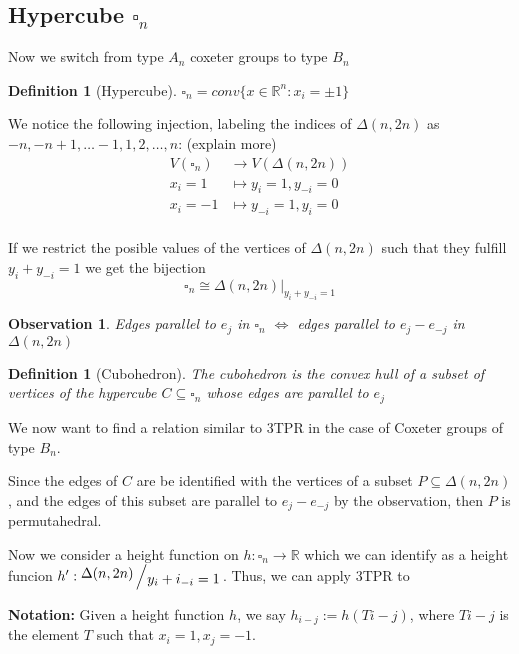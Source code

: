 \documentclass[leqno]{article}
\numberwithin{equation}{section}
\numberwithin{theorem}{section}
\newtheorem{definition}[theorem]{Definition}
\newtheorem{observation}[theorem]{Observation}
\newcommand{\bigslant}[2]{{\raisebox{.2em}{$#1$}\left/\raisebox{-.2em}{$#2$}\right.}}
\begin{document}
\subsection{Hypercube $\square_n$}

Now we switch from type $A_n$ coxeter groups to type $B_n$

\begin{definition}[Hypercube]
$\square_n  = conv\{x\in \mathbb{R}^n: x_i = \pm 1\}$
\end{definition}

We notice the following injection, labeling the indices of $\Delta(n, 2n)$ as  $-n, -n+1,  \ldots -1, 1, 2, \ldots ,n$: (explain more)
\begin{align*}
  V(\square_n) &\to V(\Delta(n, 2n)) \\
  x_i = 1 & \mapsto y_i=1, y_{-i}=0 \\
  x_i = -1 & \mapsto y_{-i}=1, y_{i}=0 \\
\end{align*}

If we restrict the posible values of the vertices of $\Delta(n, 2n)$ such that they fulfill $y_i + y_{-i} = 1$ we get the bijection
\[
\square_n \cong \Delta(n, 2n) |_{y_i+y_{-i}=1}
\] 

\begin{observation}
  \label{obs1}
  Edges parallel to $e_j$ in  $\square_n$ $\iff$ edges parallel to $e_j-e_{-j}$ in $\Delta(n, 2n)$
\end{observation}

\begin{definition}[Cubohedron]
The cubohedron is the convex hull of a subset of vertices of the hypercube $C\subseteq \square_n$ whose edges are parallel to $e_j$
\end{definition}

We now want to find a relation similar to 3TPR in the case of  Coxeter groups of type $B_n$.

Since the edges of $C$ are be identified with the vertices of a subset $P\subseteq \Delta(n, 2n)$, and the edges of this subset are parallel to $e_j-e_{-j}$ by the observation, then $P$ is permutahedral.

Now we consider a height function on $h:\square_n \to \mathbb{R}$ which we can identify as a height funcion $h': \bigslant{\Delta(n, 2n)}{y_i+i_{-i} = 1}$. Thus, we can apply 3TPR to 

\textbf{Notation:} Given a height function $h$, we say $h_{i-j}:=h(Ti-j)$, where $Ti-j$ is the element $T$ such that $x_i = 1, x_j = -1$.
\end{document}
